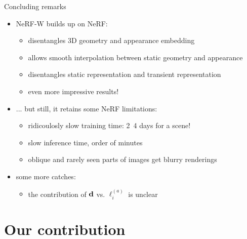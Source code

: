 \documentclass[aspectratio=1610]{beamer}
\begin{document}
\begin{frame}{Concluding remarks}
    \begin{itemize}
        \item NeRF-W builds up on NeRF:
        \begin{itemize}
            \item disentangles 3D geometry and appearance embedding
            \item allows smooth interpolation between static geometry and appearance
            \item disentangles static representation and transient representation
            \item even more impressive results!
        \end{itemize}
        \pause
        \item ... but still, it retains some NeRF limitations:
        \begin{itemize}
            \item ridicoulosly slow training time: 2~4 days for a scene!
            \item slow inference time, order of minutes
            \item oblique and rarely seen parts of images get blurry renderings
        \end{itemize}
        \pause
        \item some more catches:
        \begin{itemize}
            \item the contribution of \(\vb{d}\) vs. \(\ell_i^{(a)}\) is unclear
        \end{itemize}
    \end{itemize}
\end{frame}

\section{Our contribution}
\end{document}
